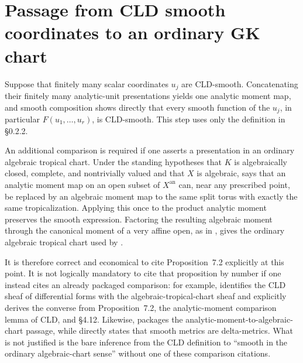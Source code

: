 \section*{Passage from CLD smooth coordinates to an ordinary GK chart}

Suppose that finitely many scalar coordinates \(u_j\) are CLD-smooth.
Concatenating their finitely many analytic-unit presentations yields one
analytic moment map, and smooth composition shows directly that every
smooth function of the \(u_j\), in particular \(F(u_1,\ldots,u_r)\), is
CLD-smooth.  This step uses only the definition in \S0.2.2.

An additional comparison is required if one asserts a presentation in an
ordinary algebraic tropical chart.  Under the standing hypotheses that
\(K\) is algebraically closed, complete, and nontrivially valued and that
\(X\) is algebraic, \cite[Proposition~7.2]{Gub16} says that an analytic
moment map on an open subset of \(X^{\mathrm{an}}\) can, near any prescribed
point, be replaced by an algebraic moment map to the same split torus with
exactly the same tropicalization.  Applying this once to the product
analytic moment preserves the smooth expression.  Factoring the resulting
algebraic moment through the canonical moment of a very affine open, as in
\cite[\S4.12]{Gub16}, gives the ordinary algebraic tropical chart used by
\cite[Definition~8.1 and Definition~9.9]{GK17}.

It is therefore correct and economical to cite Proposition~7.2 explicitly
at this point.  It is not logically mandatory to cite that proposition by
number if one instead cites an already packaged comparison: for example,
\cite[Remark~5.4]{Gub16} identifies the CLD sheaf of differential forms
with the algebraic-tropical-chart sheaf and explicitly derives the converse
from Proposition~7.2, the analytic-moment comparison lemma of CLD, and
\S4.12.  Likewise, \cite[Proposition~8.4 and \S8.3]{GK17} packages the
analytic-moment-to-algebraic-chart passage, while
\cite[Remark~9.16]{GK17} directly states that smooth metrics are
delta-metrics.  What is not justified is the bare inference from the CLD
definition to ``smooth in the ordinary algebraic-chart sense'' without one
of these comparison citations.
